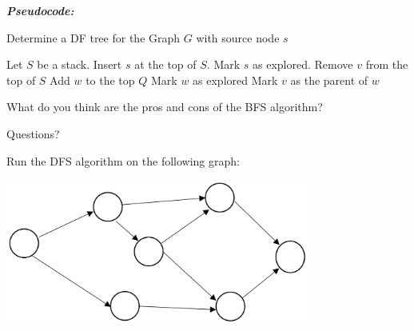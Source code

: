\documentclass[12pt]{article}
\theoremstyle{definition}
\begin{document}
\emph{\textbf{Pseudocode:}}


\begin{algorithm}
\caption{Determine a DF tree for the Graph $G$ with source node $s$}
\begin{algorithmic} 
\STATE Let $S$ be a stack.
\STATE Insert $s$ at the top of $S$.
\STATE Mark $s$ as explored.
	\STATE Remove $v$ from the top of $S$
			\STATE Add $w$ to the top $Q$
			\STATE Mark $w$ as explored
			\STATE Mark $v$ as the parent of $w$
		\ENDIF
	\ENDFOR

\ENDWHILE
\end{algorithmic}
\end{algorithm}


What do you think are the pros and cons of the BFS algorithm?

\vskip 2cm

Questions?

\vskip 2cm


Run the DFS algorithm on the following graph:

\begin{center}
\includegraphics[width=10cm]{searchgraph}
\end{center}
\end{document}
